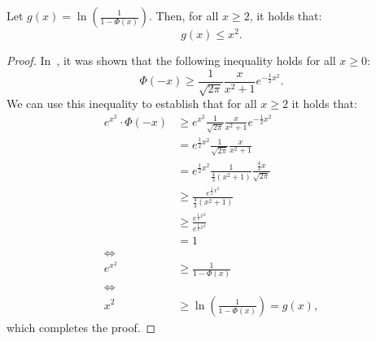 \begin{lemma}
    \label{lemma:upper-bound}
    Let $g(x) = \ln \left(\frac{1}{1 - \Phi(x)}\right)$.
    Then, for all $x \geq 2$, it holds that:
    \begin{equation*}
        g(x) \leq x^2.
    \end{equation*}
\end{lemma}
\begin{proof}
    In~\cite{gaussian_bounds}, it was shown that the following inequality
    holds for all $x \geq 0$:
    \begin{equation*}
        \Phi(-x) \geq \frac{1}{\sqrt{2 \pi}} \frac{x}{x^2 + 1} e^{-\frac{1}{2} x^2}.
    \end{equation*}
    We can use this inequality to establish that for all
    $x \geq 2$ it holds that:
    \begin{align*}
        e^{x^2} \cdot \Phi(-x) & \geq e^{x^2} \frac{1}{\sqrt{2 \pi}} \frac{x}{x^2 + 1} e^{-\frac{1}{2} x^2}                           \\
                               & = e^{\frac{1}{2} x^2} \frac{1}{\sqrt{2 \pi}} \frac{x}{x^2 + 1}                                       \\
                               & = e^{\frac{1}{2} x^2} \frac{1}{\frac{4}{3}\left( x^2 + 1 \right)} \frac{\frac{4}{3} x}{\sqrt{2 \pi}} \\
                               & \geq \frac{e^{\frac{1}{2} x^2}}{\frac{4}{3}\left( x^2 + 1 \right)}                                   \\
                               & \geq \frac{e^{\frac{1}{2} x^2}}{e^{\frac{1}{2} x^2}}                                                 \\
                               & = 1                                                                                                  \\
        \iff                                                                                                                          \\
        e^{x^2}                & \geq \frac{1}{1 - \Phi(x)}                                                                           \\
        \iff                                                                                                                          \\
        x^2                    & \geq \ln \left(\frac{1}{1 - \Phi(x)}\right) = g(x),
    \end{align*}
    which completes the proof.
\end{proof}

